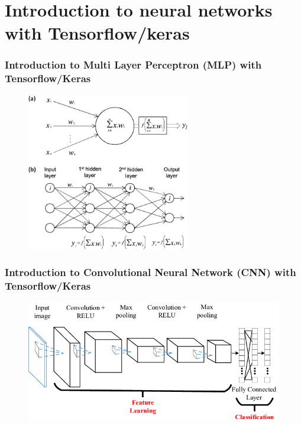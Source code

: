 \documentclass{beamer}
\begin{document}
\section{Introduction to neural networks with Tensorflow/keras} 
\begin{frame}
\frametitle{Introduction to Multi Layer Perceptron (MLP) with Tensorflow/Keras}
\begin{figure}[H] %
   \centering
   \includegraphics[width=2.8in]{figures/mlp.png} 
\end{figure}
\end{frame}

\begin{frame}
\frametitle{Introduction to Convolutional Neural Network (CNN) with Tensorflow/Keras}
\begin{figure}[H] %
   \centering
   \includegraphics[width=4.5in]{figures/cnn.png} 
   \end{figure}
\end{frame}

\end{document}
